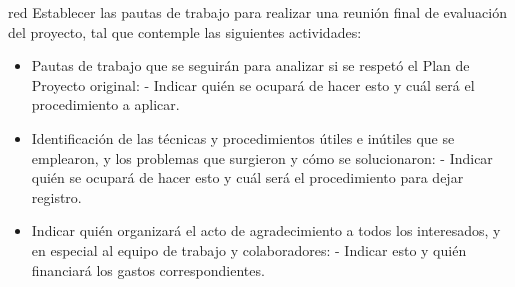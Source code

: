\documentclass[
11pt, %
codirector, %
]{charter}
\begin{document}
\begin{consigna}{red}
	Establecer las pautas de trabajo para realizar una reunión final de evaluación del proyecto, tal que contemple las siguientes actividades:

	\begin{itemize}
		\item Pautas de trabajo que se seguirán para analizar si se respetó el Plan de Proyecto original:
		      - Indicar quién se ocupará de hacer esto y cuál será el procedimiento a aplicar.
		\item Identificación de las técnicas y procedimientos útiles e inútiles que se emplearon, y los problemas que surgieron y cómo se solucionaron:
		      - Indicar quién se ocupará de hacer esto y cuál será el procedimiento para dejar registro.
		\item Indicar quién organizará el acto de agradecimiento a todos los interesados, y en especial al equipo de trabajo y colaboradores:
		      - Indicar esto y quién financiará los gastos correspondientes.
	\end{itemize}

\end{consigna}
\end{document}

